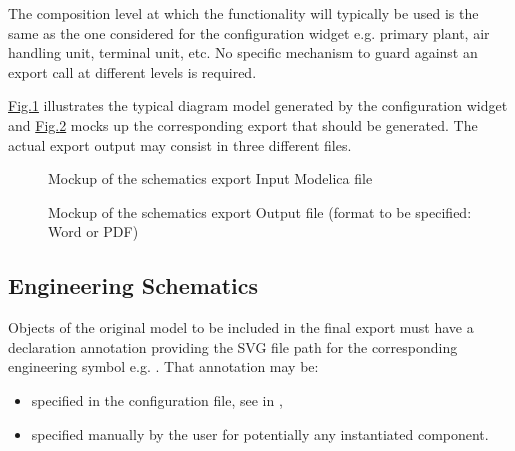 \documentclass[letterpaper,10pt, openany,english]{sphinxmanual}
\begin{document}
The composition level at which the functionality will typically be used is the same as the one considered for the configuration widget e.g. primary plant, air handling unit, terminal unit, etc. No specific mechanism to guard against an export call at different levels is required.

\hyperref[\detokenize{requirements:screen-schematics-modelica}]{Fig.\@ \ref{\detokenize{requirements:screen-schematics-modelica}}} illustrates the typical diagram model generated by the configuration widget and \hyperref[\detokenize{requirements:screen-schematics-output}]{Fig.\@ \ref{\detokenize{requirements:screen-schematics-output}}} mocks up the corresponding export that should be generated. The actual export output may consist in three different files.

\begin{figure}[htbp]
\centering
\capstart

\noindent{}
\caption{Mockup of the schematics export \textendash{} Input Modelica file}\label{\detokenize{requirements:screen-schematics-modelica}}\end{figure}

\begin{figure}[htbp]
\centering
\capstart

\noindent{}
\caption{Mockup of the schematics export \textendash{} Output file (format to be specified: Word or PDF)}\label{\detokenize{requirements:screen-schematics-output}}\end{figure}


\subsection{Engineering Schematics}
\label{\detokenize{requirements:engineering-schematics}}
Objects of the original model to be included in the final export must have a declaration annotation providing the SVG file path for the corresponding engineering symbol e.g. . That annotation may be:
\begin{itemize}
\item {} 
specified in the configuration file, see  in {\hyperref[\detokenize{requirements:configuration-api}]{}},

\item {} 
specified manually by the user for potentially any instantiated component.

\end{itemize}
\end{document}
